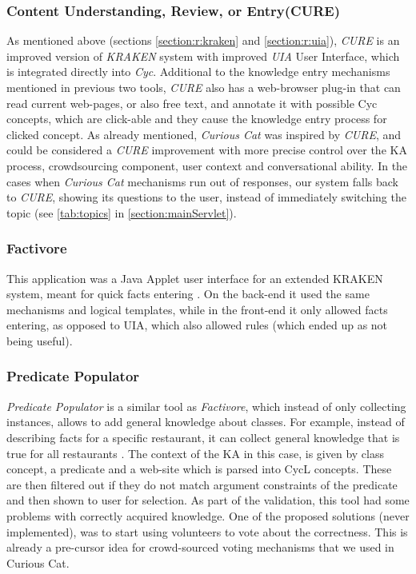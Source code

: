 \subsubsection{Content Understanding, Review, or Entry(CURE)}
\label{section:r:cure}
As mentioned above (sections \ref{section:r:kraken} and \ref{section:r:uia}),
\emph{CURE}\parencite{Witbrock2010} is an improved version of \emph{KRAKEN} 
system with improved
\emph{UIA} User Interface, which is integrated directly into \emph{Cyc}. 
Additional to the knowledge entry mechanisms mentioned in previous two tools,
\emph{CURE} also has a web-browser plug-in that can read current web-pages,
or also free text, and annotate it with possible Cyc concepts, which are
click-able and they cause the knowledge entry process for clicked concept.
As already mentioned, \emph{Curious Cat} was inspired by \emph{CURE}, and
could be considered a \emph{CURE} improvement with more precise control over the
KA process, crowdsourcing component, user context and conversational ability.
In the cases when \emph{Curious Cat} mechanisms run out of responses,
our system falls back to \emph{CURE}, showing its questions to the user, instead
of immediately switching the topic (see \autoref{tab:topics} in 
\autoref{section:mainServlet}).

\subsubsection{Factivore}
\label{section:r:factivore} 
This application was a Java Applet user interface for an extended KRAKEN system,
meant for quick facts entering \parencite{Witbrock2005}. On the back-end it used
the same mechanisms and logical templates, while in the front-end it only
allowed facts entering, as opposed to UIA, which also allowed rules (which
ended up as not being useful).

\subsubsection{Predicate Populator}
\label{section:r:pp}
\emph{Predicate Populator} is a similar tool as \emph{Factivore}, which instead
of only collecting instances, allows to add general knowledge about classes. For
example, instead of describing facts for a specific restaurant, it can collect
general knowledge that is true for all restaurants \parencite{Witbrock2005}. The
context of the KA in this case, is given by class concept, a predicate and a 
web-site which is parsed into CycL concepts. These are then filtered out if they
do not match argument constraints of the predicate and then shown to user for 
selection. As part of the validation, this tool had some problems with correctly
acquired knowledge. One of the proposed solutions (never implemented), was to
start using volunteers to vote about the correctness. This is already a 
pre-cursor idea for crowd-sourced voting mechanisms that we used in Curious Cat.

